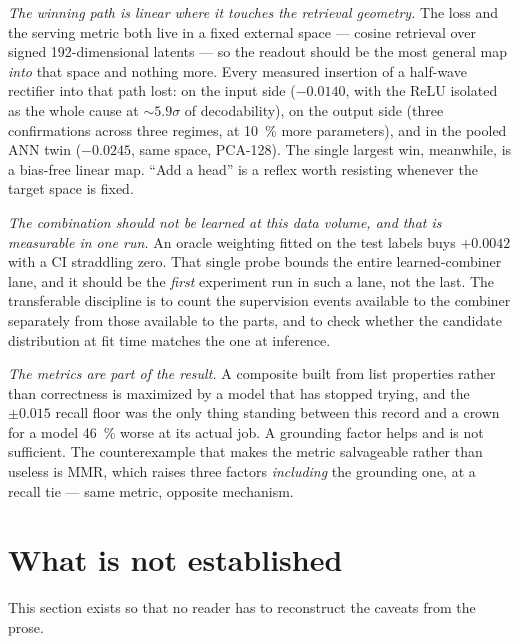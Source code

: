 \documentclass[11pt]{article}
\begin{document}
\emph{The winning path is linear where it touches the retrieval geometry.} The
loss and the serving metric both live in a fixed external space --- cosine
retrieval over signed \num{192}-dimensional latents --- so the readout should be
the most general map \emph{into} that space and nothing more. Every measured
insertion of a half-wave rectifier into that path lost: on the input side
(${-}\num{0.0140}$, with the ReLU isolated as the whole cause at
${\sim}\num{5.9}\sigma$ of decodability), on the output side (three
confirmations across three regimes, at \SI{10}{\percent} more parameters), and in
the pooled ANN twin (${-}\num{0.0245}$, same space, PCA-128). The single largest win, meanwhile, is a bias-free
linear map. ``Add a head'' is a reflex worth resisting whenever the target space
is fixed.

\emph{The combination should not be learned at this data volume, and that is
measurable in one run.} An oracle weighting fitted on the test labels buys
$+\num{0.0042}$ with a CI straddling zero. That single probe bounds the entire
learned-combiner lane, and it should be the \emph{first} experiment run in such a
lane, not the last. The transferable discipline is to count the supervision
events available to the combiner separately from those available to the parts,
and to check whether the candidate distribution at fit time matches the one at
inference.

\emph{The metrics are part of the result.} A composite built from list properties
rather than correctness is maximized by a model that has stopped trying, and the
$\pm\num{0.015}$ recall floor was the only thing standing between this record and
a crown for a model \SI{46}{\percent} worse at its actual job. A grounding factor
helps and is not sufficient. The counterexample that makes the metric salvageable
rather than useless is MMR, which raises three factors \emph{including} the
grounding one, at a recall tie --- same metric, opposite mechanism.

\clearpage
\section{What is not established}
\label{sec:notestablished}

This section exists so that no reader has to reconstruct the caveats from the
prose.
\end{document}
